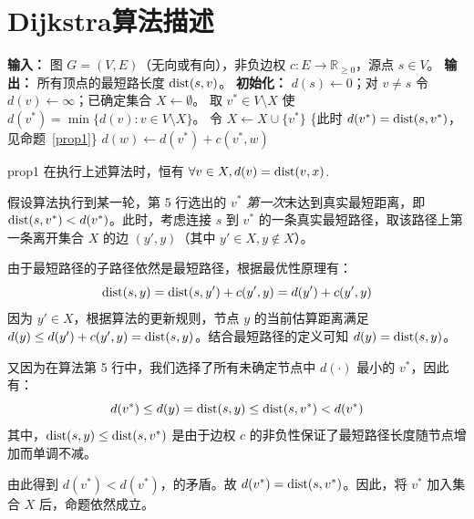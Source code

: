 	

	\section{Dijkstra算法描述}
	
	\begin{algorithm}[H]
		\caption{Dijkstra 算法}
		\begin{algorithmic}[1]
			\State \textbf{输入：} 图 $G = (V, E)$（无向或有向），非负边权 $c: E \to \mathbb{R}_{\geq 0}$，源点 $s \in V$。
			\State \textbf{输出：} 所有顶点的最短路长度 $\text{dist}(s, v)$。
			\State \textbf{初始化：} $d(s) \gets 0$；对 $v \neq s$ 令 $d(v) \gets \infty$；已确定集合 $X \gets \emptyset$。
			\State 取 $v^* \in V \setminus X$ 使 $d(v^*) = \min\{d(v) : v \in V \setminus X\}$。
			\State 令 $X \leftarrow X \cup \{v^*\}$ \quad \{此时 $d(v^*) = \text{dist}(s, v^*)$，见命题~\ref{prop1}\}
			\State $d(w) \gets d(v^*) + c(v^*, w)$
			\EndIf
			\EndFor
			\EndWhile
		\end{algorithmic}
	\end{algorithm}
	
	\begin{prop*}{}{prop1}
		在执行上述算法时，恒有 $\forall v \in X, d(v) = \text{dist}(v,x)$.
	\end{prop*}
	
	\begin{pf}
	假设算法执行到某一轮，第 5 行选出的 $v^*$ \textit{第一次}未达到真实最短距离，即 $\text{dist}(s, v^*) < d(v^*)$。此时，考虑连接 $s$ 到 $v^*$ 的一条真实最短路径，取该路径上第一条离开集合 $X$ 的边 $(y', y)$（其中 $y' \in X, y \notin X$）。
	
	由于最短路径的子路径依然是最短路径，根据最优性原理有：
	\[ \text{dist}(s, y) = \text{dist}(s, y') + c(y', y) = d(y') + c(y', y) \]
	因为 $y' \in X$，根据算法的更新规则，节点 $y$ 的当前估算距离满足 $d(y) \leq d(y') + c(y', y) = \text{dist}(s, y)$。结合最短路径的定义可知 $d(y) = \text{dist}(s, y)$。
	
	又因为在算法第 5 行中，我们选择了所有未确定节点中 $d(\cdot)$ 最小的 $v^*$，因此有：
	\[ d(v^*) \leq d(y) = \text{dist}(s, y) \leq \text{dist}(s, v^*) < d(v^*) \]
	其中，$\text{dist}(s, y) \leq \text{dist}(s, v^*)$ 是由于边权 $c$ 的非负性保证了最短路径长度随节点增加而单调不减。
	
	由此得到 $d(v^*) < d(v^*)$，的矛盾。故 $d(v^*) = \text{dist}(s, v^*)$。因此，将 $v^*$ 加入集合 $X$ 后，命题依然成立。
	\end{pf}
	
